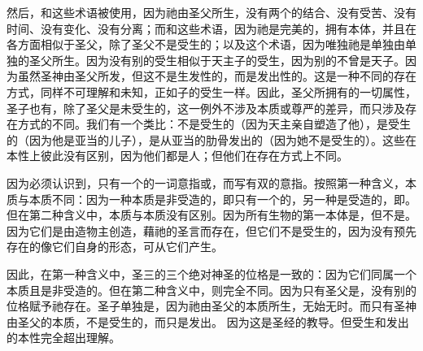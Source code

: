 然后，和这些术语被使用，因为祂由圣父所生，没有两个的结合、没有受苦、没有时间、没有变化、没有分离；而和这些术语，因为祂是完美的，拥有本体，并且在各方面相似于圣父，除了圣父不是受生的；以及这个术语，因为唯独祂是单独由单独的圣父所生。因为没有别的受生相似于天主子的受生，因为别的不曾是天子。因为虽然圣神由圣父所发，但这不是生发性的，而是发出性的。这是一种不同的存在方式，同样不可理解和未知，正如子的受生一样。因此，圣父所拥有的一切属性，圣子也有，除了圣父是未受生的，这一例外不涉及本质或尊严的差异，而只涉及存在方式的不同。我们有一个类比：不是受生的（因为天主亲自塑造了他），是受生的（因为他是亚当的儿子），是从亚当的肋骨发出的（因为她不是受生的）。这些在本性上彼此没有区别，因为他们都是人；但他们在存在方式上不同。\par

因为必须认识到，只有一个的一词意指或，而写有双的意指。按照第一种含义，本质与本质不同：因为一种本质是非受造的，即只有一个的，另一种是受造的，即。但在第二种含义中，本质与本质没有区别。因为所有生物的第一本体是，但不是。因为它们是由造物主创造，藉祂的圣言而存在，但它们不是受生的，因为没有预先存在的像它们自身的形态，可从它们产生。\par

因此，在第一种含义中，圣三的三个绝对神圣的位格是一致的：因为它们同属一个本质且是非受造的。但在第二种含义中，则完全不同。因为只有圣父是，没有别的位格赋予祂存在。圣子单独是，因为祂由圣父的本质所生，无始无时。而只有圣神由圣父的本质，不是受生的，而只是发出。 因为这是圣经的教导。但受生和发出的本性完全超出理解。\par

